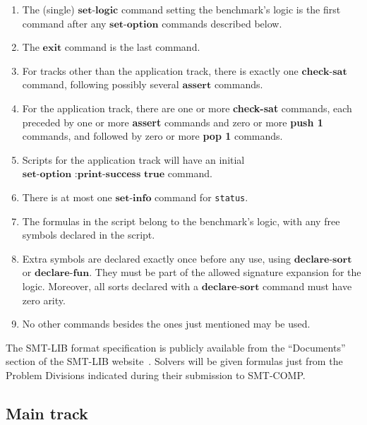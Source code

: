 \documentclass[12pt]{article}
\newcommand{\akey}[1]{\textbf{#1}}
\begin{document}
\begin{enumerate}
\item The (single) $\akey{set-logic}$ command setting the benchmark's
logic is the first command after any $\akey{set-option}$ commands described below.
\item The $\akey{exit}$ command is the last command.
\item For tracks other than the application track, there is exactly one $\akey{check-sat}$ command,
following possibly several $\akey{assert}$ commands.
\item For the application track, there are one or more \akey{check-sat} commands, 
  each preceded by one or more \akey{assert} commands 
  and zero or more \akey{push 1} commands, 
  and followed by zero or more \akey{pop 1} commands.
\item Scripts for the application track will have an initial $\akey{set-option :print-success true}$ command.
\item There is at most one $\akey{set-info}$ command for \texttt{status}.
\item The formulas in the script belong to the benchmark's logic, with
any free symbols declared in the script.
\item Extra symbols are declared exactly once before any
  use, using $\akey{declare-sort}$
  or $\akey{declare-fun}$.
  They must be part of the allowed signature expansion for the logic.
  Moreover, all sorts declared with a $\akey{declare-sort}$ command must have zero arity.


\item No other commands besides the ones just mentioned may be used.

\end{enumerate}

  
\noindent The SMT-LIB format specification is publicly
available from the ``Documents'' section of the SMT-LIB
website~\cite{SMT-LIB}.  Solvers will be given formulas just from the
Problem Divisions indicated during their submission to SMT-COMP.

\subsection{Main track}
\label{sec:exec:main}
\end{document}
